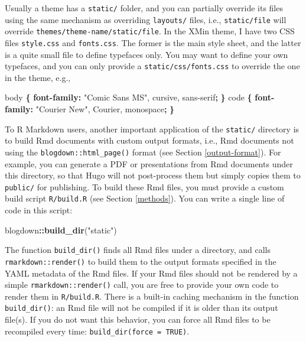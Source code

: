 \documentclass[12pt,]{krantz}
\makeatletter
\newenvironment{Shaded}{\begin{snugshade}}{\end{snugshade}}
\newcommand{\KeywordTok}[1]{\textcolor[rgb]{0.13,0.29,0.53}{\textbf{#1}}}
\newcommand{\DataTypeTok}[1]{\textcolor[rgb]{0.13,0.29,0.53}{#1}}
\newcommand{\StringTok}[1]{\textcolor[rgb]{0.31,0.60,0.02}{#1}}
\newcommand{\OperatorTok}[1]{\textcolor[rgb]{0.81,0.36,0.00}{\textbf{#1}}}
\newcommand{\NormalTok}[1]{#1}
\newenvironment{kframe}{%
\medskip{}
\setlength{\fboxsep}{.8em}
 \def\at@end@of@kframe{}%
 \ifinner\ifhmode%
  \def\at@end@of@kframe{\end{minipage}}%
  \begin{minipage}{\columnwidth}%
 \fi\fi%
 \def\FrameCommand##1{\hskip\@totalleftmargin \hskip-\fboxsep
 \colorbox{shadecolor}{##1}\hskip-\fboxsep
     \hskip-\linewidth \hskip-\@totalleftmargin \hskip\columnwidth}%
 \MakeFramed {\advance\hsize-\width
   \@totalleftmargin\z@ \linewidth\hsize
   \@setminipage}}%
 {\par\unskip\endMakeFramed%
 \at@end@of@kframe}
\renewenvironment{Shaded}{\begin{kframe}}{\end{kframe}}
\theoremstyle{definition}
\theoremstyle{definition}
\theoremstyle{definition}
\theoremstyle{remark}
\makeatother
\begin{document}
Usually a theme has a \texttt{static/} folder, and you can partially
override its files using the same mechanism as overriding
\texttt{layouts/} files, i.e., \texttt{static/file} will override
\texttt{themes/theme-name/static/file}. In the XMin theme, I have two
CSS files \texttt{style.css} and \texttt{fonts.css}. The former is the
main style sheet, and the latter is a quite small file to define
typefaces only. You may want to define your own typefaces, and you can
only provide a \texttt{static/css/fonts.css} to override the one in the
theme, e.g.,

\begin{Shaded}
\begin{Highlighting}[]
\NormalTok{body }\KeywordTok{\{}
  \KeywordTok{font-family:} \StringTok{"Comic Sans MS"}\NormalTok{, }\DataTypeTok{cursive}\NormalTok{, }\DataTypeTok{sans-serif}\KeywordTok{;}
\KeywordTok{\}}
\NormalTok{code }\KeywordTok{\{}
  \KeywordTok{font-family:} \StringTok{"Courier New"}\NormalTok{, Courier, }\DataTypeTok{monospace}\KeywordTok{;}
\KeywordTok{\}}
\end{Highlighting}
\end{Shaded}

To R Markdown users, another important application of the
\texttt{static/} directory is to build Rmd documents with custom output
formats, i.e., Rmd documents not using the
\texttt{blogdown::html\_page()} format (see Section
\ref{output-format}). For example, you can generate a PDF or
presentations from Rmd documents under this directory, so that Hugo will
not post-process them but simply copies them to \texttt{public/} for
publishing. To build these Rmd files, you must provide a custom build
script \texttt{R/build.R} (see Section \ref{methods}). You can write a
single line of code in this script:

\begin{Shaded}
\begin{Highlighting}[]
\NormalTok{blogdown}\OperatorTok{::}\KeywordTok{build_dir}\NormalTok{(}\StringTok{"static"}\NormalTok{)}
\end{Highlighting}
\end{Shaded}

The function \texttt{build\_dir()} finds all Rmd files under a
directory, and calls \texttt{rmarkdown::render()} to build them to the
output formats specified in the YAML metadata of the Rmd files. If your
Rmd files should not be rendered by a simple
\texttt{rmarkdown::render()} call, you are free to provide your own code
to render them in \texttt{R/build.R}. There is a built-in caching
mechanism in the function \texttt{build\_dir()}: an Rmd file will not be
compiled if it is older than its output file(s). If you do not want this
behavior, you can force all Rmd files to be recompiled every time:
\texttt{build\_dir(force\ =\ TRUE)}.
\end{document}
